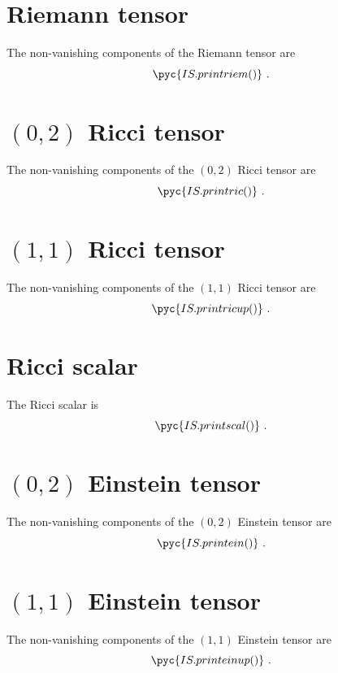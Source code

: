 \documentclass[a4paper, 12pt]{memoir}
\begin{document}
\section{Riemann tensor}
    The non-vanishing components of the Riemann tensor are
    \begin{equation*}
        \pyc{IS.printriem()} ~.
    \end{equation*}

\section{$(0,2)$ Ricci tensor}
    The non-vanishing components of the $(0,2)$ Ricci tensor are
    \begin{equation*}
        \pyc{IS.printric()} ~.
    \end{equation*}

\section{$(1,1)$ Ricci tensor}
    The non-vanishing components of the $(1,1)$ Ricci tensor are
    \begin{equation*}
        \pyc{IS.printricup()} ~.
    \end{equation*}

\section{Ricci scalar}
    The Ricci scalar is
    \begin{equation*}
        \pyc{IS.printscal()} ~.
    \end{equation*}

\section{$(0,2)$ Einstein tensor}
    The non-vanishing components of the $(0,2)$ Einstein tensor are
    \begin{equation*}
        \pyc{IS.printein()} ~.
    \end{equation*}

\section{$(1,1)$ Einstein tensor}
    The non-vanishing components of the $(1,1)$ Einstein tensor are
    \begin{equation*}
        \pyc{IS.printeinup()} ~.
    \end{equation*}
    
\end{document}
